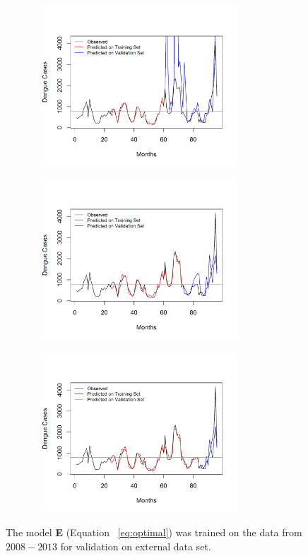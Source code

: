 \documentclass{bmcart}
\begin{document}
\begin{figure}[htbp]
	\begin{minipage}[c]{0.98\textwidth}
		\vspace*{\fill}
		\centering
		\includegraphics[width=10cm,height=6.0cm]{20-Validate-2008-2012}
		\label{fig:validate1}\par\vfill
		\includegraphics[width=10cm,height=6.0cm]{21-Validate-2008-2013}
		\caption{The model \textbf{E} (Equation ~\ref{eq:optimal}) was trained on the data from $2008-2013$ for validation on external data set. }
		\label{fig:validate2} \par\vfill
		\includegraphics[width=10cm,height=6.0cm]{22-Validate-2008-2014}
		\label{fig:validate3}
		

\end{minipage}
\end{figure}
\end{document}
